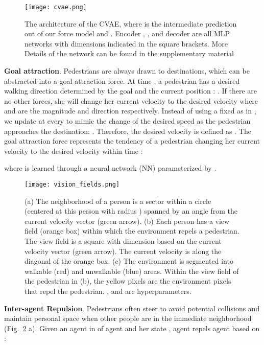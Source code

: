 \documentclass[runningheads]{llncs}
\newcommand{\figref}[1]{Fig.~\ref{fig:#1}}
\begin{document}
\begin{figure}[tb]
\centering
\texttt{[image: cvae.png]}
\caption{The architecture of the CVAE, where  is the intermediate prediction out of our force model and . Encoder , ,  and decoder  are all MLP networks with dimensions indicated in the square brackets. More Details of the network can be found in the supplementary material}
\label{fig:CVAE}
\end{figure}

\textbf{Goal attraction}. Pedestrians are always drawn to destinations, which can be abstracted into a goal attraction force. At time , a pedestrian has a desired walking direction  determined by the goal  and the current position : . If there are no other forces, she will change her current velocity to the desired velocity  where  and  are the magnitude and direction respectively. Instead of using a fixed  as in \cite{helbing1995social}, we update  at every  to mimic the change of the desired speed as the pedestrian approaches the destination: . Therefore, the desired velocity is defined as .
The goal attraction force  represents the tendency of a pedestrian changing her current velocity  to the desired velocity  within time :

where  is learned through a neural network (NN) parameterized by .

\begin{figure}[tb]
\centering
\texttt{[image: vision\_fields.png]}
\caption{(a) The neighborhood  of a person is a sector within a circle (centered at this person with radius ) spanned by an angle  from the current velocity vector (green arrow). (b) Each person has a view field (orange box) within which the environment repels a pedestrian. The view field is a square with dimension  based on the current velocity vector (green arrow). The current velocity is along the diagonal of the orange box. (c) The environment is segmented into walkable (red) and unwalkable (blue) areas. Within the view field of the pedestrian in (b), the yellow pixels are the environment pixels that repel the pedestrian. ,  and  are hyperparameters.}
\label{fig:forceFields}
\end{figure}

\textbf{Inter-agent Repulsion}. Pedestrians often steer to avoid potential collisions and maintain personal space when other people are in the immediate neighborhood (\figref{forceFields} a). Given an agent  in  of agent  and her state , agent  repels agent  based on :
\end{document}
